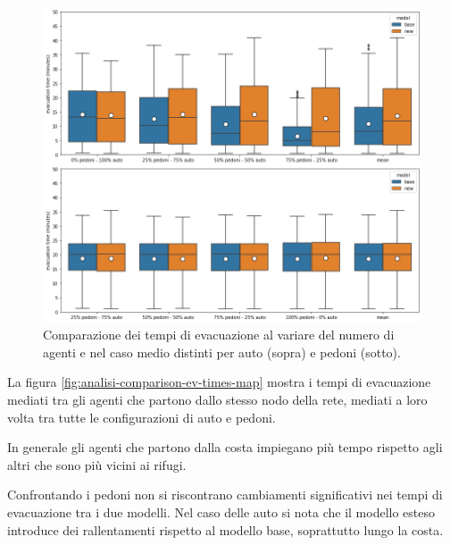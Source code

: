 \begin{figure}[ht]
    \centering
    \includegraphics[width=\textwidth]{images/analisi/comparison-evtimes2.png}
    \caption{
        Comparazione dei tempi di evacuazione al variare del numero di agenti e nel caso medio distinti per auto (sopra) e pedoni (sotto).
    }
    \label{fig:analisi-comparison-evtimes2}
\end{figure}

\pagebreak

La figura \ref{fig:analisi-comparison-ev-times-map} mostra i tempi di evacuazione mediati tra gli agenti che partono dallo stesso nodo della rete,
mediati a loro volta tra tutte le configurazioni di auto e pedoni.

In generale gli agenti che partono dalla costa impiegano più tempo rispetto agli altri che sono più vicini ai rifugi.

Confrontando i pedoni non si riscontrano cambiamenti significativi nei tempi di evacuazione tra i due modelli.
Nel caso delle auto si nota che il modello esteso introduce dei rallentamenti rispetto al modello base,
soprattutto lungo la costa.

